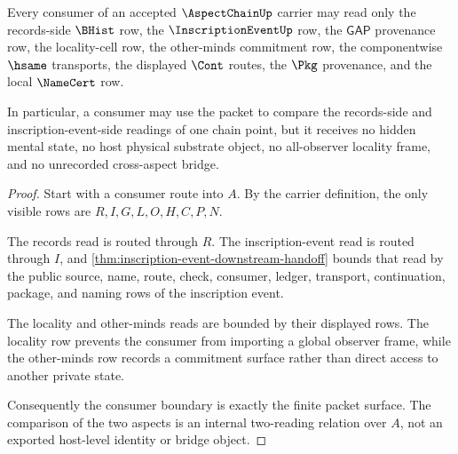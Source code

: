 \begin{theorem}
\label{thm:aspect-chain-consumer-boundary}
Every consumer of an accepted $\AspectChainUp$ carrier may read only the records-side $\BHist$ row, the $\InscriptionEventUp$ row, the $\mathsf{GAP}$ provenance row, the locality-cell row, the other-minds commitment row, the componentwise $\hsame$ transports, the displayed $\Cont$ routes, the $\Pkg$ provenance, and the local $\NameCert$ row.

In particular, a consumer may use the packet to compare the records-side and inscription-event-side readings of one chain point, but it receives no hidden mental state, no host physical substrate object, no all-observer locality frame, and no unrecorded cross-aspect bridge.
\end{theorem}
\begin{proof}
Start with a consumer route into $A$. By the carrier definition, the only visible rows are $R,I,G,L,O,H,C,P,N$.

The records read is routed through $R$. The inscription-event read is routed through $I$, and \autoref{thm:inscription-event-downstream-handoff} bounds that read by the public source, name, route, check, consumer, ledger, transport, continuation, package, and naming rows of the inscription event.

The locality and other-minds reads are bounded by their displayed rows. The locality row prevents the consumer from importing a global observer frame, while the other-minds row records a commitment surface rather than direct access to another private state.

Consequently the consumer boundary is exactly the finite packet surface. The comparison of the two aspects is an internal two-reading relation over $A$, not an exported host-level identity or bridge object.
\end{proof}


